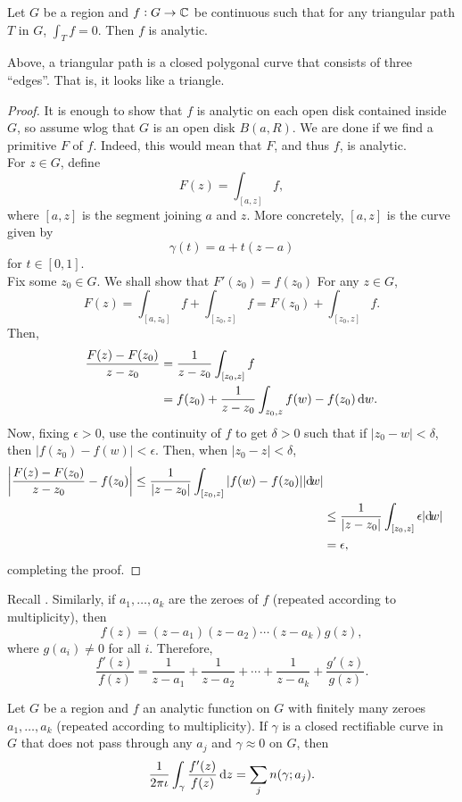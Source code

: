 		\begin{ftheo}
			\label{moreras theorem}
			Let $G$ be a region and $f : G \to \mathbb{C}$ be continuous such that for any triangular path $T$ in $G$, $\int_T f = 0$. Then $f$ is analytic.
		\end{ftheo}
		Above, a triangular path is a closed polygonal curve that consists of three ``edges''. That is, it looks like a triangle.
		\begin{proof}
			It is enough to show that $f$ is analytic on each open disk contained inside $G$, so assume wlog that $G$ is an open disk $B(a,R)$.
			We are done if we find a primitive $F$ of $f$. Indeed, this would mean that $F$, and thus $f$, is analytic.\\
			For $z \in G$, define
			\[ F(z) = \int_{[a,z]} f, \]
			where $[a,z]$ is the segment joining $a$ and $z$. More concretely, $[a,z]$ is the curve given by
			\[ \gamma(t) = a + t(z-a) \]
			for $t \in [0,1]$.\\
			Fix some $z_0 \in G$. We shall show that $F'(z_0) = f(z_0)$ For any $z \in G$,
			\[ F(z) = \int_{[a,z_0]} f + \int_{[z_0,z]} f = F(z_0) + \int_{[z_0,z]} f . \]
			Then,
			\begin{align*}
				\frac{F(z) - F(z_0)}{z-z_0} &= \frac{1}{z-z_0} \int_{[z_0,z]} f \\
					&= f(z_0) + \frac{1}{z-z_0} \int_{z_0,z} f(w) - f(z_0) \dif w.
			\end{align*}
			Now, fixing $\epsilon > 0$, use the continuity of $f$ to get $\delta > 0$ such that if $|z_0 - w| < \delta$, then $|f(z_0) - f(w)| < \epsilon$. Then, when $|z_0 - z| < \delta$,
			\begin{align*}
				\left| \frac{F(z) - F(z_0)}{z-z_0} - f(z_0) \right| \le \frac{1}{|z-z_0|} \int_{[z_0,z]} |f(w) - f(z_0)| |{\dif}{w}| \\
					&\le \frac{1}{|z-z_0|} \int_{[z_0,z]} \epsilon |{\dif}{w}| \\
					&= \epsilon,
			\end{align*}
			completing the proof.
		\end{proof}

		Recall . Similarly, if $a_1,\ldots,a_k$ are the zeroes of $f$ (repeated according to multiplicity), then
		\[ f(z) = (z-a_1)(z-a_2)\cdots(z-a_k) g(z), \]
		where $g(a_i) \ne 0$ for all $i$. Therefore,
		\[ \frac{f'(z)}{f(z)} = \frac{1}{z-a_1} + \frac{1}{z-a_2} + \cdots + \frac{1}{z-a_k} + \frac{g'(z)}{g(z)}. \]

		\begin{prop}
			Let $G$ be a region and $f$ an analytic function on $G$ with finitely many zeroes $a_1,\ldots,a_k$ (repeated according to multiplicity). If $\gamma$ is a closed rectifiable curve in $G$ that does not pass through any $a_j$ and $\gamma \approx 0$ on $G$, then
			\[ \frac{1}{2\pi\iota} \int_\gamma \frac{f'(z)}{f(z)} \dif z = \sum_j n(\gamma;a_j). \]
		\end{prop}

